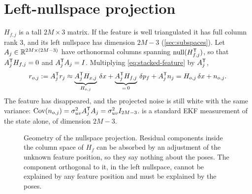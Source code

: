\section{Left-nullspace projection}

$H_{f,j}$ is a tall $2M\times3$ matrix. If the feature is well triangulated it has full column rank 3, and its left nullspace
has dimension $2M - 3$ (\cref{sec:subspaces}). Let $A_j \in \mathbb{R}^{2M\times(2M-3)}$ have orthonormal columns spanning
$\operatorname{null}(H_{f,j}^{\mathsf{T}})$, so that $A_j^{\mathsf{T}} H_{f,j} = 0$ and $A_j^{\mathsf{T}} A_j = I$. Multiplying \eqref{eq:stacked-feature} by $A_j^{\mathsf{T}}$,
\begin{equation}
  r_{o,j} := A_j^{\mathsf{T}} r_j \approx \underbrace{A_j^{\mathsf{T}} H_{x,j}}_{H_{o,j}}\,\delta x + \underbrace{A_j^{\mathsf{T}} H_{f,j}}_{=\,0}\,\delta p_f + A_j^{\mathsf{T}} n_j
  = H_{o,j}\,\delta x + n_{o,j} .
  \label{eq:projected}
\end{equation}
The feature has disappeared, and the projected noise is still white with the same variance:
$\operatorname{Cov}(n_{o,j}) = \sigma_{uv}^2A_j^{\mathsf{T}} A_j = \sigma_{uv}^2 I_{2M-3}$.  is a standard EKF measurement of the state alone,
of dimension $2M - 3$.

\begin{figure}[t]
\centering
{}
\caption{Geometry of the nullspace projection. Residual components inside the column space of $H_f$ can be absorbed by an
adjustment of the unknown feature position, so they say nothing about the poses. The component orthogonal to it, in the
left nullspace, cannot be explained by any feature position and must be explained by the poses.}
\label{fig:nullspace}
\end{figure}

